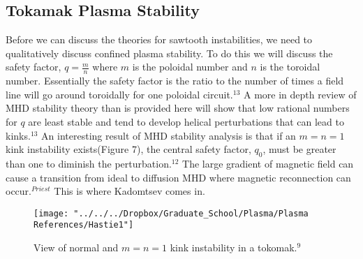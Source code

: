 \documentclass{article}
\begin{document}
\subsection{Tokamak Plasma Stability}
Before we can discuss the theories for sawtooth instabilities, we need to qualitatively discuss confined plasma stability.  To do this we will discuss the safety factor, $q=\frac{m}{n}$ where $m$ is the poloidal number and $n$ is the toroidal number.  Essentially the safety factor is the ratio to the number of times a field line will go around toroidally for one poloidal circuit.$^{13}$  A more in depth review of MHD stability theory than is provided here will show that low rational numbers for $q$ are least stable and tend to develop helical perturbations that can lead to kinks.$^{13}$  An interesting result of MHD stability analysis is that if an $m=n=1$ kink instability exists(Figure 7), the central safety factor, $q_0$, must be greater than one to diminish the perturbation.$^{12}$  The large gradient of magnetic field can cause a transition from ideal to diffusion MHD where magnetic reconnection can occur.$^{Priest}$  This is where Kadomtsev comes in.
\begin{figure}[h]
\centering
\texttt{[image: "../../../Dropbox/Graduate\_School/Plasma/Plasma References/Hastie1"]}
\caption{View of normal and $m=n=1$ kink instability in a tokomak.$^{9}$}
\label{fig:Hastie1}
\end{figure}
\end{document}
